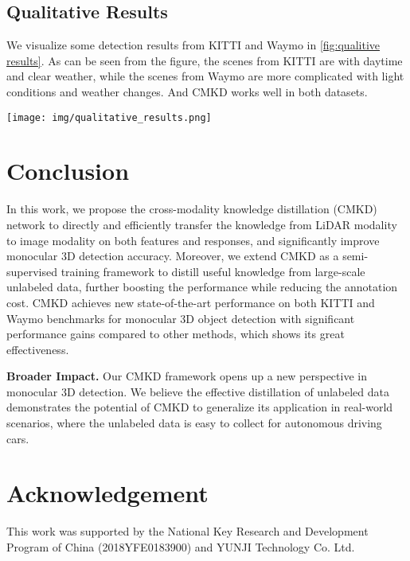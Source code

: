 \documentclass[runningheads]{llncs}
\begin{document}
\subsection{Qualitative Results}

We visualize some detection results from KITTI and Waymo in \cref{fig:qualitive results}.
As can be seen from the figure, the scenes from KITTI are with daytime and clear weather, while the scenes from Waymo are more complicated with light conditions and weather changes.
And CMKD works well in both datasets.

\begin{figure*}[t]
  \centering
  \texttt{[image: img/qualitative\_results.png]}
  \caption{Qualitative results on KITTI  (top line) and Waymo  (bottom line). None of the samples were seen during training.}
  \label{fig:qualitive results}
\end{figure*}

\newpage
\section{Conclusion}
In this work, we propose the cross-modality knowledge distillation (CMKD) network to directly and efficiently transfer the knowledge from LiDAR modality to image modality on both features and responses, and significantly improve monocular 3D detection accuracy.
Moreover, we extend CMKD as a semi-supervised training framework to distill useful knowledge from large-scale unlabeled data, further boosting the performance while reducing the annotation cost.
CMKD achieves new state-of-the-art performance on both KITTI and Waymo benchmarks for monocular 3D object detection with significant performance gains compared to other methods, which shows its great effectiveness.

\noindent\textbf{Broader Impact.} 
Our CMKD framework opens up a new perspective in monocular 3D detection.
We believe the effective distillation of unlabeled data demonstrates the potential of CMKD to generalize its application in real-world scenarios, where the unlabeled data is easy to collect for autonomous driving cars.

\section*{Acknowledgement}
This work was supported by the National Key Research and Development Program of China (2018YFE0183900) and YUNJI Technology Co. Ltd.





\end{document}
